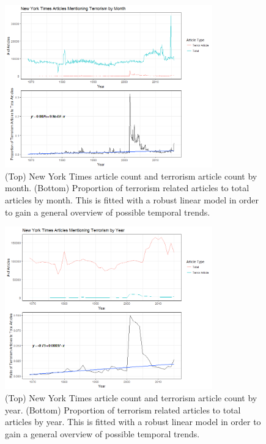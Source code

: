 \documentclass[10pt,a4paper]{article}
\begin{document}
\begin{center}
\begin{figure}[H]
		
	\includegraphics[width=0.8\textwidth]{Plots/NewsData/ArticlesByMonth.png}
	\caption{(Top) New York Times article count and terrorism article count by month. (Bottom) Proportion of terrorism related articles to total articles by month. This is fitted with a robust linear model in order to gain a general overview of possible temporal trends.}
\end{figure}

\begin{figure}[H]
	\includegraphics[width=0.8\textwidth]{Plots/NewsData/ArticlesByYear.png}
	\caption{(Top) New York Times article count and terrorism article count by year. 
	(Bottom) Proportion of terrorism related articles to total articles by year. This is fitted with a robust linear model in order to gain a general overview of possible temporal trends.}
\end{figure}


\end{center}
\end{document}

